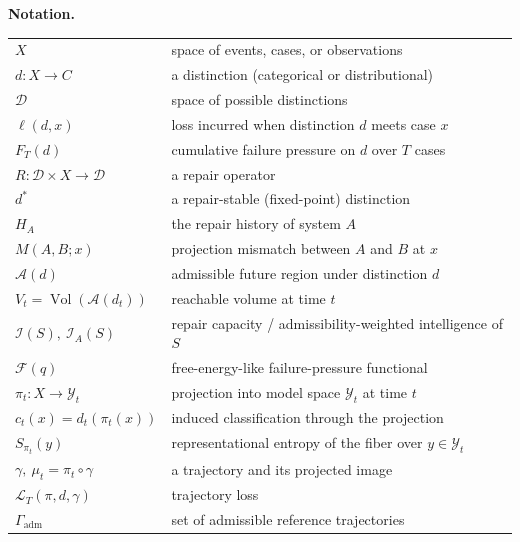 \documentclass[11pt]{article}
\theoremstyle{plain}
\theoremstyle{definition}
\theoremstyle{remark}
\begin{document}
\begin{abstract}
an inferring agent: such systems exist because the alternative does not persist. This reframing shifts the explanatory primitive from \emph{inference} to \emph{persistence}, which is a genuine conceptual gain over standard free-energy language rather than a relabeling of it.
\end{abstract}

\newpage
\vspace{0.5em}
\noindent\textbf{Notation.}
\begin{center}
\renewcommand{\arraystretch}{1.25}
\begin{tabular}{lp{10.3cm}}
$X$ & space of events, cases, or observations \\
$d : X \to C$ & a distinction (categorical or distributional) \\
$\mathcal{D}$ & space of possible distinctions \\
$\ell(d,x)$ & loss incurred when distinction $d$ meets case $x$ \\
$F_T(d)$ & cumulative failure pressure on $d$ over $T$ cases \\
$R : \mathcal{D}\times X \to \mathcal{D}$ & a repair operator \\
$d^\ast$ & a repair-stable (fixed-point) distinction \\
$H_A$ & the repair history of system $A$ \\
$M(A,B;x)$ & projection mismatch between $A$ and $B$ at $x$ \\
$\mathcal{A}(d)$ & admissible future region under distinction $d$ \\
$V_t = \operatorname{Vol}(\mathcal{A}(d_t))$ & reachable volume at time $t$ \\
$\mathcal{I}(S),\ \mathcal{I}_A(S)$ & repair capacity / admissibility-weighted intelligence of $S$ \\
$\mathcal{F}(q)$ & free-energy-like failure-pressure functional \\
\midrule
$\pi_t : X \to \mathcal{Y}_t$ & projection into model space $\mathcal{Y}_t$ at time $t$ \\
$c_t(x) = d_t(\pi_t(x))$ & induced classification through the projection \\
$S_{\pi_t}(y)$ & representational entropy of the fiber over $y \in \mathcal{Y}_t$ \\
$\gamma,\ \mu_t = \pi_t\circ\gamma$ & a trajectory and its projected image \\
$\mathcal{L}_T(\pi,d,\gamma)$ & trajectory loss \\
$\Gamma_{\mathrm{adm}}$ & set of admissible reference trajectories \\

\end{tabular}
\end{center}
\end{document}
